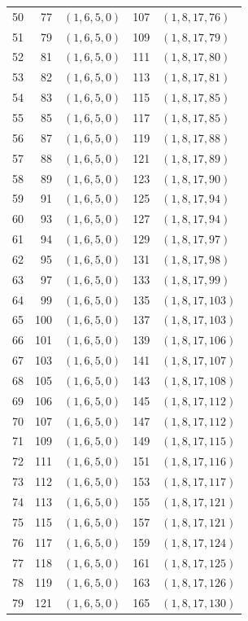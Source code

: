 \begin{center}
\begin{longtable}{@{}rrlrl@{}}
50 & 77 & $(1,6,5,0)$ & 107 & $(1,8,17,76)$\\
51 & 79 & $(1,6,5,0)$ & 109 & $(1,8,17,79)$\\
52 & 81 & $(1,6,5,0)$ & 111 & $(1,8,17,80)$\\
53 & 82 & $(1,6,5,0)$ & 113 & $(1,8,17,81)$\\
54 & 83 & $(1,6,5,0)$ & 115 & $(1,8,17,85)$\\
55 & 85 & $(1,6,5,0)$ & 117 & $(1,8,17,85)$\\
56 & 87 & $(1,6,5,0)$ & 119 & $(1,8,17,88)$\\
57 & 88 & $(1,6,5,0)$ & 121 & $(1,8,17,89)$\\
58 & 89 & $(1,6,5,0)$ & 123 & $(1,8,17,90)$\\
59 & 91 & $(1,6,5,0)$ & 125 & $(1,8,17,94)$\\
60 & 93 & $(1,6,5,0)$ & 127 & $(1,8,17,94)$\\
61 & 94 & $(1,6,5,0)$ & 129 & $(1,8,17,97)$\\
62 & 95 & $(1,6,5,0)$ & 131 & $(1,8,17,98)$\\
63 & 97 & $(1,6,5,0)$ & 133 & $(1,8,17,99)$\\
64 & 99 & $(1,6,5,0)$ & 135 & $(1,8,17,103)$\\
65 & 100 & $(1,6,5,0)$ & 137 & $(1,8,17,103)$\\
66 & 101 & $(1,6,5,0)$ & 139 & $(1,8,17,106)$\\
67 & 103 & $(1,6,5,0)$ & 141 & $(1,8,17,107)$\\
68 & 105 & $(1,6,5,0)$ & 143 & $(1,8,17,108)$\\
69 & 106 & $(1,6,5,0)$ & 145 & $(1,8,17,112)$\\
70 & 107 & $(1,6,5,0)$ & 147 & $(1,8,17,112)$\\
71 & 109 & $(1,6,5,0)$ & 149 & $(1,8,17,115)$\\
72 & 111 & $(1,6,5,0)$ & 151 & $(1,8,17,116)$\\
73 & 112 & $(1,6,5,0)$ & 153 & $(1,8,17,117)$\\
74 & 113 & $(1,6,5,0)$ & 155 & $(1,8,17,121)$\\
75 & 115 & $(1,6,5,0)$ & 157 & $(1,8,17,121)$\\
76 & 117 & $(1,6,5,0)$ & 159 & $(1,8,17,124)$\\
77 & 118 & $(1,6,5,0)$ & 161 & $(1,8,17,125)$\\
78 & 119 & $(1,6,5,0)$ & 163 & $(1,8,17,126)$\\
79 & 121 & $(1,6,5,0)$ & 165 & $(1,8,17,130)$\\

\end{longtable}
\end{center}
